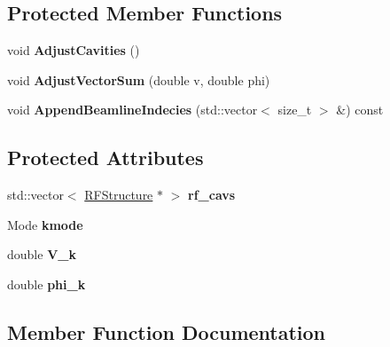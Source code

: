 \subsection*{Protected Member Functions}
\begin{DoxyCompactItemize}
\item 
\mbox{\label{classKlystron_a6b7d40b02b8c2543e5be02331f44c370}} 
void {\bfseries Adjust\+Cavities} ()
\item 
\mbox{\label{classKlystron_a488e47037173ab7db3588d45e3b5704f}} 
void {\bfseries Adjust\+Vector\+Sum} (double v, double phi)
\item 
\mbox{\label{classKlystron_a05ddf9dc32caea3476e03c55045d2054}} 
void {\bfseries Append\+Beamline\+Indecies} (std\+::vector$<$ size\+\_\+t $>$ \&) const
\end{DoxyCompactItemize}
\subsection*{Protected Attributes}
\begin{DoxyCompactItemize}
\item 
\mbox{\label{classKlystron_ad2d66efe8ade15e9fd59b0088094d641}} 
std\+::vector$<$ \hyperlink{classRFStructure}{R\+F\+Structure} $\ast$ $>$ {\bfseries rf\+\_\+cavs}
\item 
\mbox{\label{classKlystron_a580e03399e384a48593bd6c54240f0b0}} 
Mode {\bfseries kmode}
\item 
\mbox{\label{classKlystron_aa2767d918b32e2752f84143c2db9da4a}} 
double {\bfseries V\+\_\+k}
\item 
\mbox{\label{classKlystron_a0b97be677d940619294aba0cd31d1634}} 
double {\bfseries phi\+\_\+k}
\end{DoxyCompactItemize}


\subsection{Member Function Documentation}
\mbox{\label{classKlystron_a2cb5bf0328cf1f47d0d7bff0a0b55f16}} 
